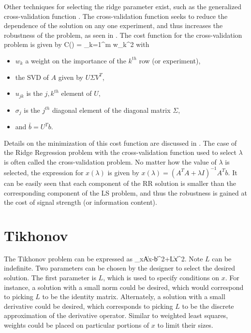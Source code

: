 Other techniques for selecting the ridge parameter exist, such as the generalized cross-validation function .  The cross-validation function seeks to reduce the dependence of the solution on any one experiment, and thus increases the robustness of the problem, as seen in .  The cost function for the cross-validation problem is given by
\beqn
C(\lambda) = \sum_{k=1}^{m} w_{k}\left[
  \frac{\bar b_{k} - \sum_{j=1}^{r}u_{kj}\bar
  b_{j}\left(\frac{\sigma_{j}^{2}}{\sigma_{j}^{2}+\lambda}\right)}
  {1 - \sum_{j=1}^{r}u_{kj}^{2}
  \left(\frac{\sigma_{j}^{2}}{\sigma_{j}^{2}+\lambda}\right)}
  \right]^{2}
\eeqn
with
\begin{itemize}
    \item $w_{k}$ a weight on the importance of the $k^{th}$ row (or experiment),
    \item the SVD of $A$ given by $U\Sigma V^{T}$,
    \item $u_{jk}$ is the $j,k^{th}$ element of $U$,
    \item $\sigma_{j}$ is the $j^{th}$ diagonal element of the diagonal matrix $\Sigma$,
    \item and $\bar b=U^{T}b$.
\end{itemize}
Details on the minimization of this cost function are discussed in .  The case of the Ridge Regression problem with the cross-validation function used to select $\lambda$ is often called the cross-validation problem.  No matter how the value of $\lambda$ is selected, the expression for $x(\lambda)$ is given by $x(\lambda)=(A^{T}A+\lambda I)^{-1}A^{T}b$.  It can be easily seen that each component of the RR solution is smaller than the corresponding component of the LS problem, and thus the robustness is gained at the cost of signal strength (or information content).

\section{Tikhonov}\label{s-tik}

The Tikhonov problem can be expressed as
\beq
\min_{x}\| Ax-b\|^{2}+\lambda \|Lx\|^{2}.
\eeq
Note $L$ can be indefinite.  Two parameters can be chosen by the designer to select the desired solution.  The first parameter is $L$, which is used to specify conditions on $x$.  For instance, a solution with a small norm could be desired, which would correspond to picking $L$ to be the identity matrix.  Alternately, a solution with a small derivative could be desired, which corresponds to picking $L$ to be the discrete approximation of the derivative operator.  Similar to weighted least squares, weights could be placed on particular portions of $x$ to limit their sizes.

